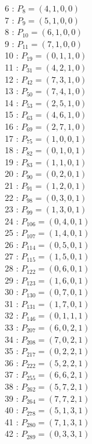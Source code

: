 \documentclass{article}
\begin{document}
{\begin{multicols}{3}
6 : $P_{8}=( 4, 1, 0, 0 )$\\
7 : $P_{9}=( 5, 1, 0, 0 )$\\
8 : $P_{10}=( 6, 1, 0, 0 )$\\
9 : $P_{11}=( 7, 1, 0, 0 )$\\
10 : $P_{19}=( 0, 1, 1, 0 )$\\
11 : $P_{31}=( 4, 2, 1, 0 )$\\
12 : $P_{42}=( 7, 3, 1, 0 )$\\
13 : $P_{50}=( 7, 4, 1, 0 )$\\
14 : $P_{53}=( 2, 5, 1, 0 )$\\
15 : $P_{63}=( 4, 6, 1, 0 )$\\
16 : $P_{69}=( 2, 7, 1, 0 )$\\
17 : $P_{75}=( 1, 0, 0, 1 )$\\
18 : $P_{82}=( 0, 1, 0, 1 )$\\
19 : $P_{83}=( 1, 1, 0, 1 )$\\
20 : $P_{90}=( 0, 2, 0, 1 )$\\
21 : $P_{91}=( 1, 2, 0, 1 )$\\
22 : $P_{98}=( 0, 3, 0, 1 )$\\
23 : $P_{99}=( 1, 3, 0, 1 )$\\
24 : $P_{106}=( 0, 4, 0, 1 )$\\
25 : $P_{107}=( 1, 4, 0, 1 )$\\
26 : $P_{114}=( 0, 5, 0, 1 )$\\
27 : $P_{115}=( 1, 5, 0, 1 )$\\
28 : $P_{122}=( 0, 6, 0, 1 )$\\
29 : $P_{123}=( 1, 6, 0, 1 )$\\
30 : $P_{130}=( 0, 7, 0, 1 )$\\
31 : $P_{131}=( 1, 7, 0, 1 )$\\
32 : $P_{146}=( 0, 1, 1, 1 )$\\
33 : $P_{207}=( 6, 0, 2, 1 )$\\
34 : $P_{208}=( 7, 0, 2, 1 )$\\
35 : $P_{217}=( 0, 2, 2, 1 )$\\
36 : $P_{222}=( 5, 2, 2, 1 )$\\
37 : $P_{255}=( 6, 6, 2, 1 )$\\
38 : $P_{262}=( 5, 7, 2, 1 )$\\
39 : $P_{264}=( 7, 7, 2, 1 )$\\
40 : $P_{278}=( 5, 1, 3, 1 )$\\
41 : $P_{280}=( 7, 1, 3, 1 )$\\
42 : $P_{289}=( 0, 3, 3, 1 )$\\

\end{multicols}}
\end{document}
